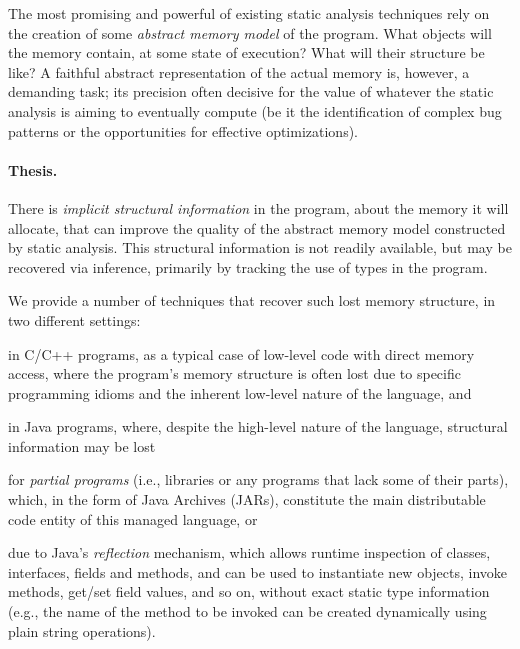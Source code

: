 The most promising and powerful of existing static analysis techniques
rely on the creation of some \emph{abstract memory model} of the
program. What objects will the memory contain, at some state of
execution? What will their structure be like?  A faithful abstract
representation of the actual memory is, however, a demanding task; its
precision often decisive for the value of whatever the static
analysis is aiming to eventually compute (be it the identification of
complex bug patterns or the opportunities for effective
optimizations).

\paragraph*{Thesis.}
\begin{displayquote}
  There is \emph{implicit structural information} in the program,
  about the memory it will allocate, that can improve the quality of
  the abstract memory model constructed by static analysis. This
  structural information is not readily available, but may be
  recovered via inference, primarily by tracking the use of types in
  the program.
\end{displayquote}

We provide a number of techniques that recover such
lost memory structure, in two different settings:
\begin{inparaenum}[(1)]
\item in C/C++ programs, as a typical case of low-level code with
  direct memory access, where the program's memory structure is often
  lost due to specific programming idioms and the inherent low-level
  nature of the language, and
\item in Java programs, where, despite the high-level nature of the
  language, structural information may be lost
  \begin{inparaenum}[(a)]
  \item for \emph{partial programs} (i.e., libraries or any programs that
    lack some of their parts), which, in the form of Java Archives
    (JARs), constitute the main distributable code entity of this
    managed language, or
  \item due to Java's \emph{reflection} mechanism, which allows
    runtime inspection of classes, interfaces, fields and methods, and
    can be used to instantiate new objects, invoke methods, get/set
    field values, and so on, without exact static type information
    (e.g., the name of the method to be invoked can be created
    dynamically using plain string operations).
  \end{inparaenum}
\end{inparaenum}


